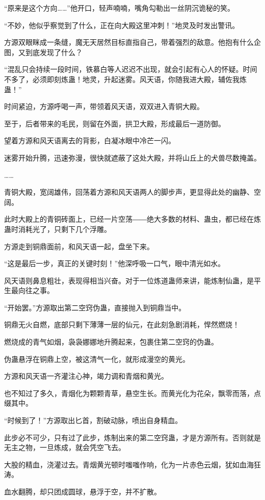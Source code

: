 \begin{this_body}
“原来是这个方向……”他开口，轻声喃喃，嘴角勾勒出一丝阴沉诡秘的笑。

“不妙，他似乎察觉到了什么，正在向大殿这里冲刺！”地灵及时发出警讯。

方源双眼眯成一条缝，魔无天居然目标直指自己，带着强烈的敌意。他抱有什么企图，又到底发现了什么？

“混乱只会持续一段时间，铁慕白等人迟迟不出现，就会引起有心人的怀疑。时间不多了，必须即刻炼蛊！地灵，升起迷雾。风天语，你随我进大殿，辅佐我炼蛊！”

时间紧迫，方源呼喝一声，带领着风天语，双双进入青铜大殿。

至于，后者带来的毛民，则留在外面，拱卫大殿，形成最后一道防御。

望着方源和风天语离去的背影，白凝冰眼中冷芒一闪。

迷雾开始升腾，迅速弥漫，很快就遮蔽了这处大殿，并将山丘上的犬兽尽数掩盖。

……

青铜大殿，宽阔雄伟，回荡着方源和风天语两人的脚步声，更显得此处的幽静、空阔。

此时大殿上的青铜砖面上，已经一片空荡――绝大多数的材料、蛊虫，都已经在炼蛊时消耗光了，只剩下几个浮雕。

方源走到铜鼎面前，和风天语一起，盘坐下来。

“这是最后一步，真正的关键时刻！”他深呼吸一口气，眼中清光如水。

风天语则鼻息粗壮，表现得相当兴奋。对于一位炼道蛊师来讲，能炼制仙蛊，是平生最向往之事。

“开始罢。”方源取出第二空窍伪蛊，直接抛入到铜鼎当中。

铜鼎无火自燃，底部只剩下薄薄一层的仙元，在此刻急剧消耗，悍然燃烧！

燃烧成的青气如烟，袅袅娜娜地升腾起来，包裹住第二空窍的伪蛊。

伪蛊悬浮在铜鼎上空，被这清气一化，就形成漫空的黄光。

方源和风天语一齐灌注心神，竭力调和青烟和黄光。

也不知过了多久，青烟化为颗颗青草，悬空生长。而黄光化为花朵，飘零而落，点缀其中。

“时候到了！”方源取出匕首，割破动脉，喷出自身精血。

此步必不可少，只有过了此步，炼制出来的第二空窍蛊，才是方源所有。否则就是无主之物，一旦炼成，就会凭空飞去。

大股的精血，浇灌过去。青烟黄光顿时嗤嗤作响，化为一片赤色云烟，犹如血海狂涛。

血水翻腾，却只团成圆球，悬浮于空，并不扩散。


\end{this_body}

